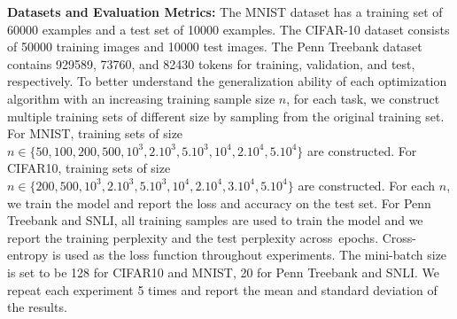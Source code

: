 \documentclass[11pt]{article}
\begin{document}
\textbf{Datasets and Evaluation Metrics:}  The MNIST dataset has a training set of 60000 examples and a test set of 10000 examples. The CIFAR-10 dataset consists of 50000 
training images and 10000 test images. The Penn Treebank dataset contains 929589, 73760, and 82430 tokens for training, validation, and test,  respectively.
To better understand the generalization ability of each optimization algorithm with an increasing training sample size $n$, for each task, we construct multiple training sets of different size by sampling from the original training set. For MNIST, training sets of size $n \in \{50, 100, 200, 500, 10^3, 2.10^3, 5.10^3, 10^4, 2.10^4, 5.10^4 \}$ are constructed. For CIFAR10, training sets of size $n \in \{ 200, 500, 10^3, 2.10^3, 5.10^3, 10^4, 2.10^4,3.10^4, 5.10^4\}$ are constructed. 
For each $n$, we train the model and report the loss and accuracy on the test set.  
For Penn Treebank and SNLI, all training samples are used to train the model and we report the training perplexity and the test perplexity across~epochs. 
Cross-entropy is used as the loss function throughout experiments. The mini-batch size is set to be 128 for CIFAR10 and MNIST, 20 for Penn Treebank and SNLI. 
We repeat each experiment 5 times and report the mean and standard deviation of the results.
\end{document}
